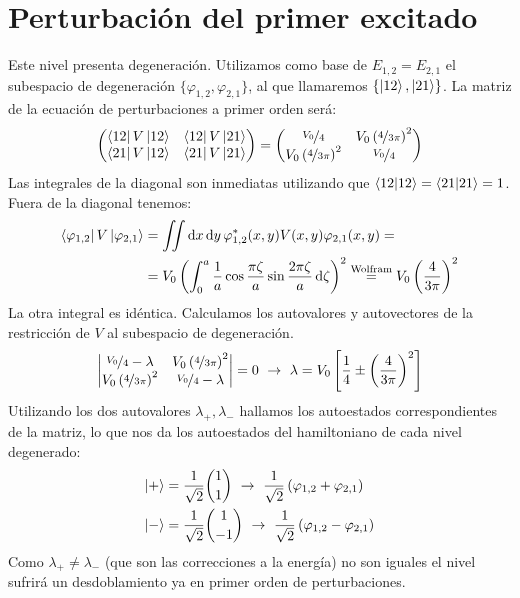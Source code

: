 \section{Perturbación del primer excitado}
Este nivel presenta degeneración. Utilizamos como base de
$E_{1,2}=E_{2,1}$ el subespacio de degeneración
$\{\varphi_{1,2},\varphi_{2,1}\}$, al que llamaremos $\{\ket{12},\ket{21}\}$.
La matriz de la ecuación de perturbaciones a primer orden será:
\begin{equation}
  \begin{pmatrix}
    \bra{12}V\ket{12} & \bra{12}V\ket{21} \\
    \bra{21}V\ket{12} & \bra{21}V\ket{21} 
  \end{pmatrix} = 
  \begin{pmatrix}
    \nicefrac{V_0}{4} & V_0 \left( \nicefrac{4}{3\pi} \right)^2 \\
      V_0 \left( \nicefrac{4}{3\pi} \right)^2 & \nicefrac{V_0}{4} 
  \end{pmatrix}
\end{equation}
Las integrales de la diagonal son inmediatas utilizando que
$\braket{12}{12}=\braket{21}{21}=1$. Fuera de la diagonal tenemos:
\begin{equation}
  \begin{split}
    \bra{\varphi_{1,2}}V\ket{\varphi_{2,1}} &= \iint \dd{x}
    \dd{y} \varphi_{1,2}^*(x,y) V(x,y) \varphi_{2,1}(x,y) = \\
    &= V_0\left(\int_0^a \frac{1}{a} \cos \frac{\pi \zeta}{a} \sin
      \frac{2\pi \zeta}{a} \dd{\zeta} \right)^2 \stackrel{\text{Wolfram}}{=} V_0 \left( \frac{4}{3\pi} \right)^2
  \end{split}
\end{equation}
La otra integral es idéntica. Calculamos los autovalores y
autovectores de la restricción de $V$ al subespacio de degeneración.
\begin{equation}
  \begin{vmatrix}
    \nicefrac{V_0}{4} - \lambda & V_0 \left( \nicefrac{4}{3\pi} \right)^2 \\
      V_0 \left( \nicefrac{4}{3\pi} \right)^2 & \nicefrac{V_0}{4} -\lambda
  \end{vmatrix} = 0 \ \rightarrow \ \lambda = V_0 \left[ \frac{1}{4}
    \pm \left( \frac{4}{3\pi} \right)^2 \right]
\end{equation}
Utilizando los dos autovalores $\lambda_+,\lambda_-$ hallamos los
autoestados correspondientes de la matriz, lo que nos da los autoestados
del hamiltoniano de cada nivel degenerado:
\begin{align}
  \ket{+} &= \frac{1}{\sqrt{2}}\binom{1}{1} \ \rightarrow \
  \frac{1}{\sqrt{2}} \left( \varphi_{1,2} + \varphi_{2,1}  \right)\\
  \ket{-} &= \frac{1}{\sqrt{2}}\binom{1}{-1} \ \rightarrow \
  \frac{1}{\sqrt{2}} \left( \varphi_{1,2} - \varphi_{2,1}  \right)
\end{align}
Como $\lambda_+ \neq \lambda_-$ (que son las correcciones a la
energía) no son iguales el nivel sufrirá un desdoblamiento ya en
primer orden de perturbaciones.


